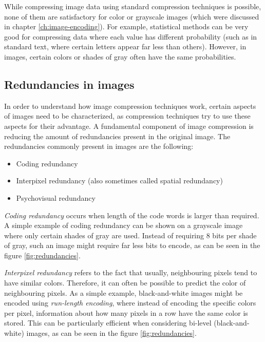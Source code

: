 \documentclass[thesis=M,english]{FITthesis}[2012/10/20]
\begin{document}
While compressing image data using standard compression techniques is possible, none of them
are satisfactory for color or grayscale images (which were discussed in chapter
\ref{ch:image-encoding}). For example, statistical methods can be very good for
compressing data where each value has different probability (such as in standard
text, where certain letters appear far less than others). However, in images, certain
colors or shades of gray often have the same probabilities.\cite{datacompressioncompleteref}

\subsection{Redundancies in images}
\label{sec:imgcmpr-redund}
In order to understand how image compression techniques work, certain aspects of
images need to be characterized, as compression techniques try to use these
aspects for their advantage. A fundamental component of image compression is
reducing the amount of redundancies present in the original image. The redundancies
commonly present in images are the following:

\begin{itemize}
  \item Coding redundancy
  \item Interpixel redundancy (also sometimes called spatial redundancy)
  \item Psychovisual redundancy
\end{itemize}
\cite{fromdcttowavelet}

\emph{Coding redundancy} occurs when length of the code words is larger than
required. A simple example of coding redundancy can be shown on a grayscale
image where only certain shades of gray are used. Instead of requiring
8 bits per shade of gray, such an image might require far less bits to
encode, as can be seen in the figure \ref{fig:redundancies}.

\emph{Interpixel redundancy} refers to the fact that usually, neighbouring pixels
tend to have similar colors. Therefore, it can often be possible to predict
the color of neighbouring pixels. As a simple example, black-and-white images
might be encoded using \emph{run-length encoding}, where instead of 
encoding the specific colors per pixel, information about how many
pixels in a row have the same color is stored. This can be particularly
efficient when considering bi-level (black-and-white) images, as can be seen
in the figure \ref{fig:redundancies}.
\end{document}
